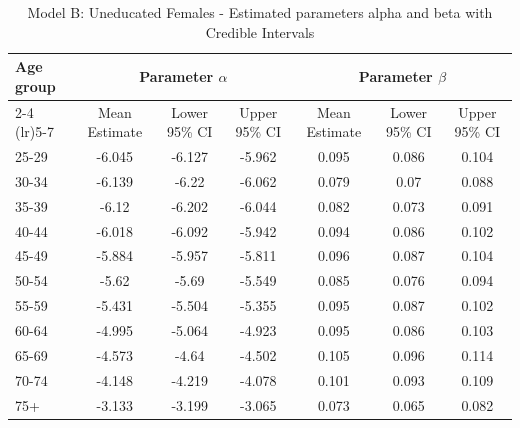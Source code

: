 \begin{landscape}
\begin{table}[htbp]
\centering
\caption{Model B: Uneducated Females - Estimated parameters alpha and beta  with Credible Intervals}
\label{tab:parameters_ab9}
\begin{tabular}{@{}lcccccc@{}}
\toprule
Age group & \multicolumn{3}{c}{Parameter \(\alpha\)} & \multicolumn{3}{c}{Parameter \(\beta\)} \\ 
\cmidrule(lr){2-4} \cmidrule(lr){5-7}
          & Mean Estimate & Lower 95\% CI & Upper 95\% CI & Mean Estimate & Lower 95\% CI & Upper 95\% CI \\ 
\midrule
25-29 & -6.045 & -6.127 & -5.962 & 0.095 & 0.086 & 0.104 \\
30-34 & -6.139 & -6.22 & -6.062 & 0.079 & 0.07 & 0.088 \\
35-39 & -6.12 & -6.202 & -6.044 & 0.082 & 0.073 & 0.091 \\
40-44 & -6.018 & -6.092 & -5.942 & 0.094 & 0.086 & 0.102 \\
45-49 & -5.884 & -5.957 & -5.811 & 0.096 & 0.087 & 0.104 \\
50-54 & -5.62 & -5.69 & -5.549 & 0.085 & 0.076 & 0.094 \\
55-59 & -5.431 & -5.504 & -5.355 & 0.095 & 0.087 & 0.102 \\
60-64 & -4.995 & -5.064 & -4.923 & 0.095 & 0.086 & 0.103 \\
65-69 & -4.573 & -4.64 & -4.502 & 0.105 & 0.096 & 0.114 \\
70-74 & -4.148 & -4.219 & -4.078 & 0.101 & 0.093 & 0.109 \\
75+ & -3.133 & -3.199 & -3.065 & 0.073 & 0.065 & 0.082 \\
\bottomrule
\end{tabular}
\end{table}
\end{landscape}